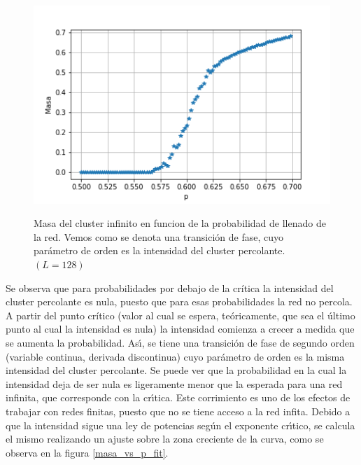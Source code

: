 \documentclass[
 reprint,
 amsmath,amssymb,
 aps,
]{revtex4-1}
\begin{document}
\begin{figure}[ht]
\begin{center}
\includegraphics[scale=0.62]{../images/masa_vs_p.png} \\
\caption{Masa del cluster infinito en funcion de la probabilidad de llenado de la red. Vemos como se denota una transici\'on de fase, cuyo par\'ametro de orden es la intensidad del cluster percolante. $(L = 128)$}\label{masa_vs_p}
\end{center}
\end{figure}

Se observa que para probabilidades por debajo de la cr\'itica la intensidad del cluster percolante es nula, puesto que para esas probabilidades la red no percola. A partir del punto cr\'itico (valor al cual se espera, te\'oricamente, que sea el \'ultimo punto al cual la intensidad es nula) la intensidad comienza a crecer a medida que se aumenta la probabilidad. As\'\i, se tiene una transici\'on de fase de segundo orden (variable continua, derivada discontinua) cuyo par\'ametro de orden es la misma intensidad del cluster percolante. Se puede ver que la probabilidad en la cual la intensidad deja de ser nula es ligeramente menor que la esperada para una red infinita, que corresponde con la cr\'\i tica. Este corrimiento es uno de los efectos de trabajar con redes finitas, puesto que no se tiene acceso a la red infita. Debido a que la intensidad sigue una ley de potencias seg\'un el exponente cr\'\i tico, se calcula el mismo realizando un ajuste sobre la zona creciente de la curva, como se observa en la figura \ref{masa_vs_p_fit}.
\end{document}
